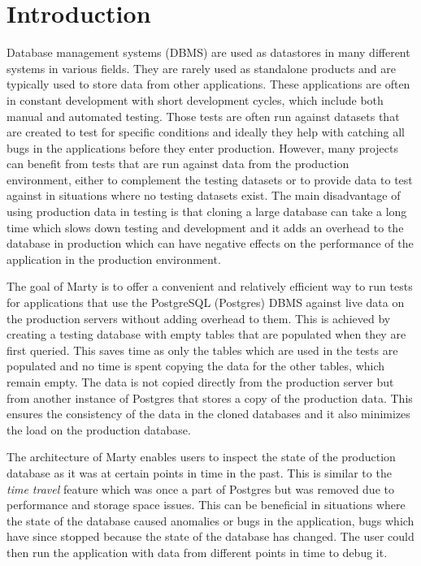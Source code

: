 \chapter{Introduction}
\setcounter{page}{1}
Database management systems (DBMS) are used as datastores in many different systems in various fields.
They are rarely used as standalone products and are typically used to store data from other applications.
These applications are often in constant development with short development cycles, which include both manual and automated testing.
Those  tests are often run against datasets that are created to test for specific conditions and ideally they help with catching all bugs in the applications before they enter production. However, many projects can benefit from tests that are run against data from the production environment, either to complement the testing datasets or to provide data to test against in situations where no testing datasets exist.
The main disadvantage of using production data in testing is that cloning a large database can take a long time which slows down testing and development and it adds an overhead to the database in production which can have negative effects on the performance of the application in the production environment.

The goal of Marty is to offer a convenient and relatively efficient way to run tests for applications that use the PostgreSQL (Postgres) DBMS against live data on the production servers without adding overhead to them.
This is achieved by creating a testing database with empty tables that are populated  when they are first queried.
This saves time as only the tables which are used in the tests are populated and no time is spent copying the data for the other tables, which remain empty.
The data is not copied directly from the production server but from another instance of Postgres that stores a copy of the production data.
This ensures the consistency of the data in the cloned databases and it also minimizes the load on the production database.

The architecture of Marty enables users to inspect the state of the production database as it was at certain points in time in the past.
This is similar to the \textit{time travel} feature which was once a part of Postgres but was removed due to performance and storage space issues.
This can be beneficial in situations where the state of the database caused anomalies or bugs in the application, bugs which have since stopped because the state of the database has changed.
The user could then run the application with data from different points in time to debug it.





